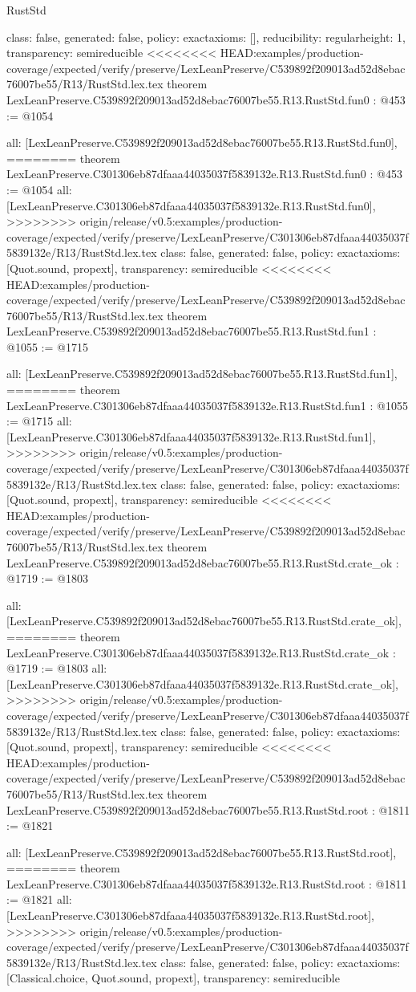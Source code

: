 \begin{lexlean}{RustStd}
\begin{coremodule}
{\begin{coremodule}
{{{  class: false,
  generated: false,
  policy: exact{axioms: []},
  reducibility: regular{height: 1},
  transparency: semireducible
}
<<<<<<<< HEAD:examples/production-coverage/expected/verify/preserve/LexLeanPreserve/C539892f209013ad52d8ebac76007be55/R13/RustStd.lex.tex
theorem LexLeanPreserve.C539892f209013ad52d8ebac76007be55.R13.RustStd.fun0 : @453 := @1054 {
  all: [LexLeanPreserve.C539892f209013ad52d8ebac76007be55.R13.RustStd.fun0],
========
theorem LexLeanPreserve.C301306eb87dfaaa44035037f5839132e.R13.RustStd.fun0 : @453 := @1054 {
  all: [LexLeanPreserve.C301306eb87dfaaa44035037f5839132e.R13.RustStd.fun0],
>>>>>>>> origin/release/v0.5:examples/production-coverage/expected/verify/preserve/LexLeanPreserve/C301306eb87dfaaa44035037f5839132e/R13/RustStd.lex.tex
  class: false,
  generated: false,
  policy: exact{axioms: [Quot.sound, propext]},
  transparency: semireducible
}
<<<<<<<< HEAD:examples/production-coverage/expected/verify/preserve/LexLeanPreserve/C539892f209013ad52d8ebac76007be55/R13/RustStd.lex.tex
theorem LexLeanPreserve.C539892f209013ad52d8ebac76007be55.R13.RustStd.fun1 : @1055 := @1715 {
  all: [LexLeanPreserve.C539892f209013ad52d8ebac76007be55.R13.RustStd.fun1],
========
theorem LexLeanPreserve.C301306eb87dfaaa44035037f5839132e.R13.RustStd.fun1 : @1055 := @1715 {
  all: [LexLeanPreserve.C301306eb87dfaaa44035037f5839132e.R13.RustStd.fun1],
>>>>>>>> origin/release/v0.5:examples/production-coverage/expected/verify/preserve/LexLeanPreserve/C301306eb87dfaaa44035037f5839132e/R13/RustStd.lex.tex
  class: false,
  generated: false,
  policy: exact{axioms: [Quot.sound, propext]},
  transparency: semireducible
}
<<<<<<<< HEAD:examples/production-coverage/expected/verify/preserve/LexLeanPreserve/C539892f209013ad52d8ebac76007be55/R13/RustStd.lex.tex
theorem LexLeanPreserve.C539892f209013ad52d8ebac76007be55.R13.RustStd.crate_ok : @1719 := @1803 {
  all: [LexLeanPreserve.C539892f209013ad52d8ebac76007be55.R13.RustStd.crate_ok],
========
theorem LexLeanPreserve.C301306eb87dfaaa44035037f5839132e.R13.RustStd.crate_ok : @1719 := @1803 {
  all: [LexLeanPreserve.C301306eb87dfaaa44035037f5839132e.R13.RustStd.crate_ok],
>>>>>>>> origin/release/v0.5:examples/production-coverage/expected/verify/preserve/LexLeanPreserve/C301306eb87dfaaa44035037f5839132e/R13/RustStd.lex.tex
  class: false,
  generated: false,
  policy: exact{axioms: [Quot.sound, propext]},
  transparency: semireducible
}
<<<<<<<< HEAD:examples/production-coverage/expected/verify/preserve/LexLeanPreserve/C539892f209013ad52d8ebac76007be55/R13/RustStd.lex.tex
theorem LexLeanPreserve.C539892f209013ad52d8ebac76007be55.R13.RustStd.root : @1811 := @1821 {
  all: [LexLeanPreserve.C539892f209013ad52d8ebac76007be55.R13.RustStd.root],
========
theorem LexLeanPreserve.C301306eb87dfaaa44035037f5839132e.R13.RustStd.root : @1811 := @1821 {
  all: [LexLeanPreserve.C301306eb87dfaaa44035037f5839132e.R13.RustStd.root],
>>>>>>>> origin/release/v0.5:examples/production-coverage/expected/verify/preserve/LexLeanPreserve/C301306eb87dfaaa44035037f5839132e/R13/RustStd.lex.tex
  class: false,
  generated: false,
  policy: exact{axioms: [Classical.choice, Quot.sound, propext]},
  transparency: semireducible
}

}}}}}}
\end{coremodule}}
\end{coremodule}
\end{lexlean}
